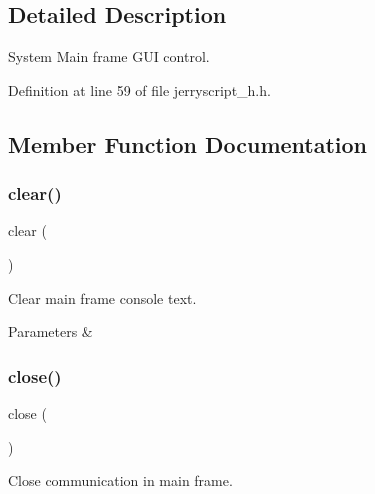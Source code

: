\subsection{Detailed Description}
System Main frame G\+UI control. 

Definition at line 59 of file jerryscript\+\_\+h.\+h.



\subsection{Member Function Documentation}
\mbox{\label{classmain__frame_aa821bec12eaa7e0f649397c9675ff505}} 
\subsubsection{clear()}
{\footnotesize\ttfamily clear (\begin{DoxyParamCaption}{ }\end{DoxyParamCaption})}



Clear main frame console text. 


\begin{DoxyCode}{0}
\end{DoxyCode}



\begin{DoxyParams}{Parameters}
{\em } & \\
\hline
\end{DoxyParams}
\mbox{\label{classmain__frame_aa69c8bf1f1dcf4e72552efff1fe3e87e}} 
\subsubsection{close()}
{\footnotesize\ttfamily close (\begin{DoxyParamCaption}{ }\end{DoxyParamCaption})}



Close communication in main frame. 


\begin{DoxyCode}{0}
\end{DoxyCode}



